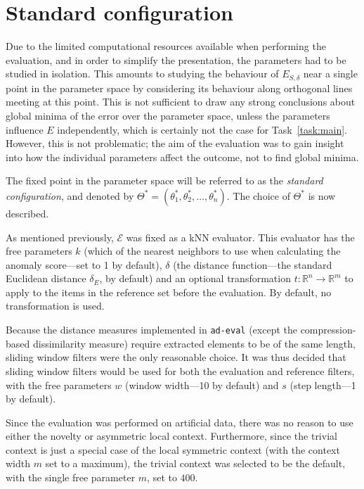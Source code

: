 \section{Standard configuration}
\label{sect:standard_config}

Due to the limited computational resources available when performing the evaluation, and in order to simplify the presentation, the parameters had to be studied in isolation. This amounts to studying the behaviour of $E_{S, \delta}$ near a single point in the parameter space by considering its behaviour along orthogonal lines meeting at this point. This is not sufficient to draw any strong conclusions about global minima of the error over the parameter space, unless the parameters influence $E$ independently, which is certainly not the case for Task~\ref{task:main}. However, this is not problematic; the aim of the evaluation was to gain insight into how the individual parameters affect the outcome, not to find global minima. 

The fixed point in the parameter space will be referred to as the \emph{standard configuration}, and denoted by $\Theta^* = (\theta_1^*, \theta_2^*, \dots, \theta_n^*)$. The choice of $\Theta^*$ is now described.

As mentioned previously, $\mathcal{E}$ was fixed as a kNN evaluator. This evaluator has the free parameters $k$ (which of the nearest neighbors to use when calculating the anomaly score---set to 1 by default), $\delta$ (the distance function---the standard Euclidean distance $\delta_E$, by default) and an optional transformation $t: \mathbb{R}^n \rightarrow \mathbb{R}^m$ to apply to the items in the reference set before the evaluation. By default, no transformation is used.

Because the distance measures implemented in \texttt{ad-eval} (except the compression-based dissimilarity measure) require extracted elements to be of the same length, sliding window filters were the only reasonable choice. It was thus decided that sliding window filters would be used for both the evaluation and reference filters, with the free parameters $w$ (window width---10 by default) and $s$ (step length---1 by default).

Since the evaluation was performed on artificial data, there was no reason to use either the novelty or asymmetric local context. Furthermore, since the trivial context is just a special case of the local symmetric context (with the context width $m$ set to a maximum), the trivial context was selected to be the default, with the single free parameter $m$, set to $400$.

